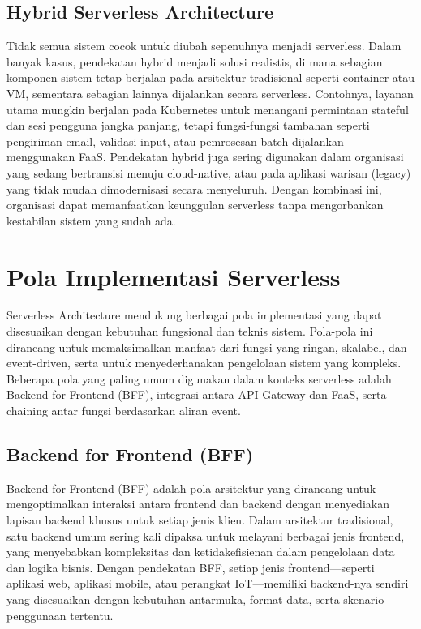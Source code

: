 \subsection{Hybrid Serverless Architecture}

Tidak semua sistem cocok untuk diubah sepenuhnya menjadi serverless. Dalam banyak kasus, pendekatan hybrid menjadi solusi realistis, di mana sebagian komponen sistem tetap berjalan pada arsitektur tradisional seperti container atau VM, sementara sebagian lainnya dijalankan secara serverless. Contohnya, layanan utama mungkin berjalan pada Kubernetes untuk menangani permintaan stateful dan sesi pengguna jangka panjang, tetapi fungsi-fungsi tambahan seperti pengiriman email, validasi input, atau pemrosesan batch dijalankan menggunakan FaaS. Pendekatan hybrid juga sering digunakan dalam organisasi yang sedang bertransisi menuju cloud-native, atau pada aplikasi warisan (legacy) yang tidak mudah dimodernisasi secara menyeluruh. Dengan kombinasi ini, organisasi dapat memanfaatkan keunggulan serverless tanpa mengorbankan kestabilan sistem yang sudah ada.


\section{Pola Implementasi Serverless}

Serverless Architecture mendukung berbagai pola implementasi yang dapat disesuaikan dengan kebutuhan fungsional dan teknis sistem. Pola-pola ini dirancang untuk memaksimalkan manfaat dari fungsi yang ringan, skalabel, dan event-driven, serta untuk menyederhanakan pengelolaan sistem yang kompleks. Beberapa pola yang paling umum digunakan dalam konteks serverless adalah Backend for Frontend (BFF), integrasi antara API Gateway dan FaaS, serta chaining antar fungsi berdasarkan aliran event.

\subsection{Backend for Frontend (BFF)}

Backend for Frontend (BFF) adalah pola arsitektur yang dirancang untuk mengoptimalkan interaksi antara frontend dan backend dengan menyediakan lapisan backend khusus untuk setiap jenis klien. Dalam arsitektur tradisional, satu backend umum sering kali dipaksa untuk melayani berbagai jenis frontend, yang menyebabkan kompleksitas dan ketidakefisienan dalam pengelolaan data dan logika bisnis. Dengan pendekatan BFF, setiap jenis frontend—seperti aplikasi web, aplikasi mobile, atau perangkat IoT—memiliki backend-nya sendiri yang disesuaikan dengan kebutuhan antarmuka, format data, serta skenario penggunaan tertentu.

